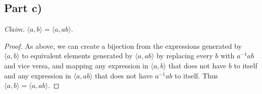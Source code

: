 \documentclass{abrice}
\begin{document}
\subsection{Part c)}

\emph{Claim.} $\langle a, b \rangle = \langle a, ab \rangle$.

\begin{proof}
  As above, we can create a bijection from the expressions generated by $\langle
  a, b \rangle$ to equivalent elements generated by $\langle a, ab \rangle$ by
  replacing every $b$ with $a^{-1}ab$ and vice versa, and mapping any
  expression in $\langle a, b \rangle$ that does not have $b$ to itself and
  any expression in $\langle a, ab \rangle$ that does not have $a^{-1} a b$ to
  itself. Thus $\langle a, b \rangle = \langle a, ab \rangle$.
\end{proof}
\end{document}

